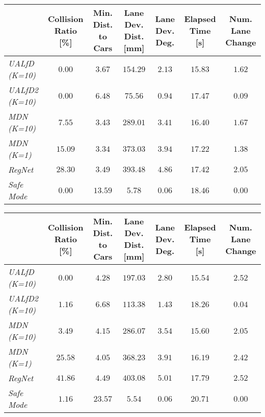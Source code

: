 \documentclass[letterpaper, 10 pt, conference]{ieeeconf}  %
\begin{document}
\begin{table*}[t!]  \center 
\begin{tabular}{ l | c c c c c c  } 
                    & Collision Ratio [\%] & Min. Dist. to Cars & Lane Dev. Dist. [mm] & Lane Dev. Deg. 
                    & Elapsed Time [s] & Num. Lane Change \\
	\hline \hline
	\textit{UALfD (K=10)}		& $\mathbf{0.00}$ 	& $3.67$ 			& $154.29$
						& $2.13$ 			& $15.83$ 		& $1.62$
	\\ 
	\textit{UALfD2 (K=10)}	& $\mathbf{0.00}$ 	& $6.48$ 			& $75.56$
						& $0.94$ 			& $17.47$ 		& $0.09$
	\\
	\textit{MDN (K=10)}     	& $7.55$ 			& $3.43$ 			& $289.01$
						& $3.41$ 			& $16.40$ 		& $1.67$
	\\
	\textit{MDN (K=1)}         	& $15.09$ 		& $3.34$ 			& $373.03$
						& $3.94$ 			& $17.22$ 		& $1.38$
	\\
	\textit{RegNet}        		& $28.30$ 		& $3.49$ 			& $393.48$
						& $4.86$ 			& $17.42$ 		& $2.05$
	\\	
	\textit{Safe Mode}     		& $0.00$ 			& $13.59$ 		& $5.78$
						& $0.06$ 			& $18.46$ 		& $0.00$
	\\	
\end{tabular}
\caption{Quantitative driving results in NGSIM dataset.}
\label{tbl:ngsim_full}

\begin{tabular}{ l | c c c c c c  } 
                    & Collision Ratio [\%] & Min. Dist. to Cars & Lane Dev. Dist. [mm] & Lane Dev. Deg. 
                    & Elapsed Time [s] & Num. Lane Change \\
	\hline \hline
	\textit{UALfD (K=10)}		& $\mathbf{0.00}$ 	& $4.28$ 			& $197.03$
						& $2.80$ 			& $15.54$ 		& $2.52$
	\\ 
	\textit{UALfD2 (K=10)}	& $1.16$ 			& $6.68$ 			& $113.38$
						& $1.43$ 			& $18.26$ 		& $0.04$
	\\
	\textit{MDN (K=10)}     	& $3.49$ 			& $4.15$ 			& $286.07$
						& $3.54$ 			& $15.60$ 		& $2.05$
	\\
	\textit{MDN (K=1)}         	& $25.58$ 		& $4.05$ 			& $368.23$
						& $3.91$ 			& $16.19$ 		& $2.42$
	\\
	\textit{RegNet}        		& $41.86$ 		& $4.49$ 			& $403.08$
						& $5.01$ 			& $17.79$ 		& $2.52$
	\\	
	\textit{Safe Mode}     		& $1.16$ 			& $23.57$ 		& $5.54$
						& $0.06$ 			& $20.71$ 		& $0.00$
	\\	
\end{tabular}
\caption{Quantitative driving results in NGSIM dataset with $80\%$
of cars.}
\label{tbl:ngsim_half}
\end{table*}
\end{document}
